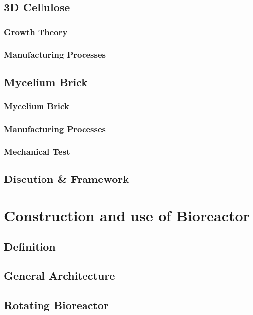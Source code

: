 \section{3D Cellulose}

\subsection{Growth Theory}
\subsection{Manufacturing Processes}



\section{Mycelium Brick}


\subsection{Mycelium Brick}
\subsection{Manufacturing Processes}
\subsection{Mechanical Test}



\section{Discution \& Framework}


\chapter{Construction and use of Bioreactor}


\section{Definition}


\section{General Architecture}


\section{Rotating Bioreactor}


